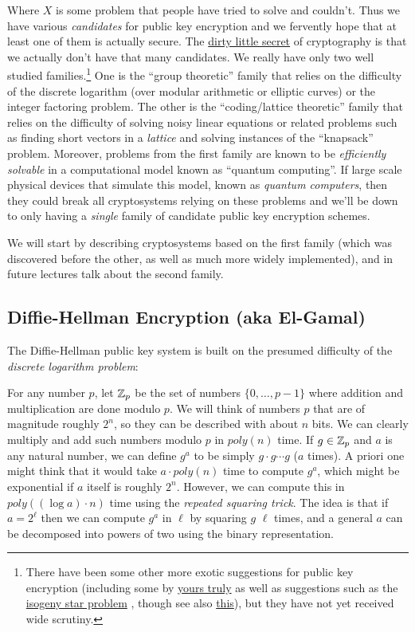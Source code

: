 Where \(X\) is some problem that people have tried to solve and
couldn't. Thus we have various \emph{candidates} for public key
encryption and we fervently hope that at least one of them is actually
secure. The \href{https://eprint.iacr.org/2017/365.pdf}{dirty little
secret} of cryptography is that we actually don't have that many
candidates. We really have only two well studied families.\footnote{There
  have been some other more exotic suggestions for public key encryption
  (including some by
  \href{http://www.eng.tau.ac.il/~bennyap/pubs/ncpkcFull1.pdf}{yours
  truly} as well as suggestions such as the
  \href{http://eprint.iacr.org/2006/291}{isogeny star problem} , though
  see also \href{http://arxiv.org/pdf/1012.4019.pdf}{this}), but they
  have not yet received wide scrutiny.} One is the ``group theoretic''
family that relies on the difficulty of the discrete logarithm (over
modular arithmetic or elliptic curves) or the integer factoring problem.
The other is the ``coding/lattice theoretic'' family that relies on the
difficulty of solving noisy linear equations or related problems such as
finding short vectors in a \emph{lattice} and solving instances of the
``knapsack'' problem. Moreover, problems from the first family are known
to be \emph{efficiently solvable} in a computational model known as
``quantum computing''. If large scale physical devices that simulate
this model, known as \emph{quantum computers}, then they could break all
cryptosystems relying on these problems and we'll be down to only having
a \emph{single} family of candidate public key encryption schemes.

We will start by describing cryptosystems based on the first family
(which was discovered before the other, as well as much more widely
implemented), and in future lectures talk about the second family.

\subsection{Diffie-Hellman Encryption (aka
El-Gamal)}\label{Diffie-Hellman-Encryption-aka-}

The Diffie-Hellman public key system is built on the presumed difficulty
of the \emph{discrete logarithm problem}:

For any number \(p\), let \({\mathbb{Z}}_p\) be the set of numbers
\(\{0,\ldots,p-1\}\) where addition and multiplication are done modulo
\(p\). We will think of numbers \(p\) that are of magnitude roughly
\(2^n\), so they can be described with about \(n\) bits. We can clearly
multiply and add such numbers modulo \(p\) in \(poly(n)\) time. If
\(g\in {\mathbb{Z}}_p\) and \(a\) is any natural number, we can define \(g^a\) to
be simply \(g\cdot g \cdots g\) (\(a\) times). A priori one might think
that it would take \(a\cdot poly(n)\) time to compute \(g^a\), which
might be exponential if \(a\) itself is roughly \(2^n\). However, we can
compute this in \(poly((\log a) \cdot n)\) time using the \emph{repeated
squaring trick}. The idea is that if \(a=2^{\ell}\) then we can compute
\(g^a\) in \(\ell\) by squaring \(g\) \(\ell\) times, and a general
\(a\) can be decomposed into powers of two using the binary
representation.

